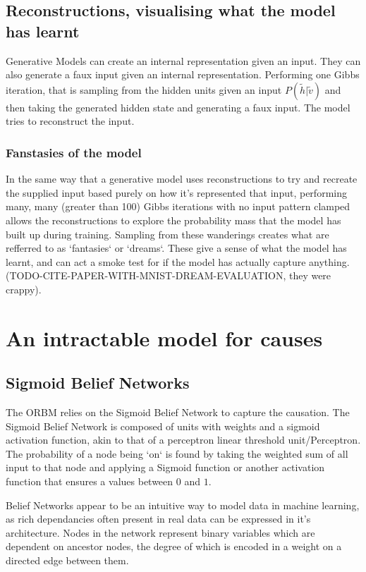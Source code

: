   \subsection{Reconstructions, visualising what the model has learnt}

  Generative Models can create an internal representation given an input. They can also generate a faux input given an internal representation. Performing one Gibbs iteration, that is sampling from the hidden units given an input $ P(\tilde{h}|\tilde{v}) $ and then taking the generated hidden state and generating a faux input. The model tries to reconstruct the input.

  \subsubsection{Fanstasies of the model}
  \todo%
  In the same way that a generative model uses reconstructions to try and recreate the  supplied input based purely on how it's represented that input, performing many, many (greater than 100) Gibbs iterations with no input pattern clamped allows the reconstructions to explore the probability mass that the model has built up during training. Sampling from these wanderings creates what are refferred to as `fantasies` or `dreams`. These give a sense of what the model has learnt, and can act a smoke test for if the model has actually capture anything.
  (TODO-CITE-PAPER-WITH-MNIST-DREAM-EVALUATION, they were crappy).

  \section{An intractable model for causes}
    \subsection{Sigmoid Belief Networks}
    \todo%

    The ORBM relies on the Sigmoid Belief Network to capture the causation. The Sigmoid Belief Network is composed of units with weights and a sigmoid activation function, akin to that of a perceptron linear threshold unit/Perceptron. The probability of a node being `on` is found by taking the weighted sum of all input to that node and applying a Sigmoid function or another activation function that ensures a values between $0$ and $1$.

    Belief Networks appear to be an intuitive way to model data in machine learning, as rich dependancies often present in real data can be expressed in it's architecture. Nodes in the network represent binary variables which are dependent on ancestor nodes, the degree of which is encoded in a weight on a directed edge between them.

